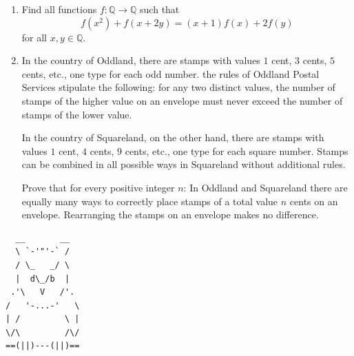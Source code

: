 \documentclass{article}
\begin{document}
\begin{enumerate}[1.]
\vfill

\item %
\newcommand{\QQ}{\mathbb{Q}}
Find all functions $f : \QQ \to \QQ$ such that
\[ f(x^2) +f(x+2y) = (x+1)f(x) +2f(y) \]
for all $x, y \in \QQ$. 


\vfill

\item %
In the country of Oddland, there are stamps with values $1$ cent, $3$ cents, $5$ cents, etc., one type for each odd number.
the rules of Oddland Postal Services stipulate the following: for any two distinct values, the number of stamps of the higher value on an envelope must never exceed the number of stamps of the lower value.

In the country of Squareland, on the other hand, there are stamps with values $1$ cent, $4$ cents, $9$ cents, etc., one type for each square number.
Stamps can be combined in all possible ways in Squareland without additional rules.

Prove that for every positive integer $n$:
In Oddland and Squareland there are equally many ways to correctly place stamps of a total value $n$ cents on an envelope.
Rearranging the stamps on an envelope makes no difference.


\end{enumerate}


\vfill
\vfill

\begin{center}
\begin{BVerbatim}
  __       __
  \ `-'"'-` /
  / \_   _/ \
  |  d\_/b  |
 .'\   V   /'.
/   '-...-'   \
| /         \ |
\/\         /\/
==(||)---(||)==
\end{BVerbatim}
\end{center}
\end{document}
